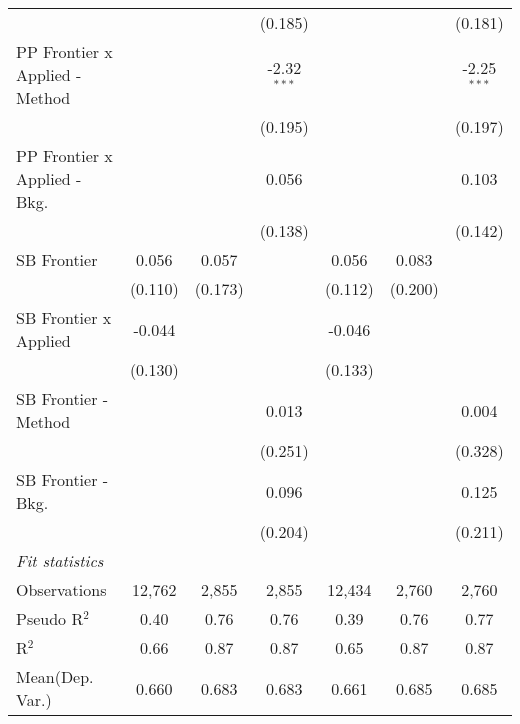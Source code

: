 \begin{tabular}{lcccccc}
                                  &                &              & (0.185)       &                &              & (0.181)\\   
   PP Frontier x Applied - Method &                &              & -2.32$^{***}$ &                &              & -2.25$^{***}$\\   
                                  &                &              & (0.195)       &                &              & (0.197)\\   
   PP Frontier x Applied - Bkg.   &                &              & 0.056         &                &              & 0.103\\   
                                  &                &              & (0.138)       &                &              & (0.142)\\   
   SB Frontier                    & 0.056          & 0.057        &               & 0.056          & 0.083        &   \\   
                                  & (0.110)        & (0.173)      &               & (0.112)        & (0.200)      &   \\   
   SB Frontier x Applied          & -0.044         &              &               & -0.046         &              &   \\   
                                  & (0.130)        &              &               & (0.133)        &              &   \\   
   SB Frontier - Method           &                &              & 0.013         &                &              & 0.004\\   
                                  &                &              & (0.251)       &                &              & (0.328)\\   
   SB Frontier - Bkg.             &                &              & 0.096         &                &              & 0.125\\   
                                  &                &              & (0.204)       &                &              & (0.211)\\   
   \midrule
   \emph{Fit statistics}\\
   Observations                   & 12,762         & 2,855        & 2,855         & 12,434         & 2,760        & 2,760\\  
   Pseudo R$^2$                   & 0.40           & 0.76         & 0.76          & 0.39           & 0.76         & 0.77\\  
   R$^2$                          & 0.66           & 0.87         & 0.87          & 0.65           & 0.87         & 0.87\\  
Mean(Dep. Var.) & 0.660 & 0.683 & 0.683 & 0.661 & 0.685 & 0.685 \\
   

\end{tabular}
